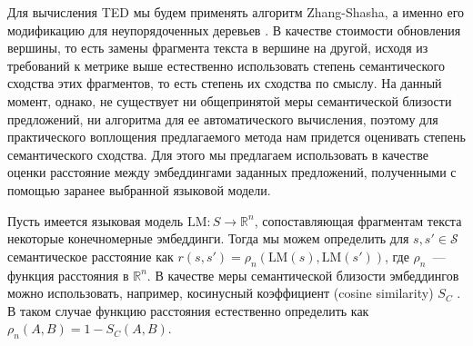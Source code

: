 \documentclass[12pt]{article}
\newcommand{\R}{\mathbb{R}}
\begin{document}
Для вычисления TED мы будем применять алгоритм Zhang-Shasha, а именно его модификацию для неупорядоченных деревьев \cite{zhang1992editing}. В качестве стоимости обновления вершины, то есть замены фрагмента текста в вершине на другой, исходя из требований к метрике выше естественно использовать степень семантического сходства этих фрагментов, то есть степень их сходства по смыслу. На данный момент, однако, не существует ни общепринятой меры семантической близости предложений, ни алгоритма для ее автоматического вычисления, поэтому для практического воплощения предлагаемого метода нам придется оценивать степень семантического сходства. Для этого мы предлагаем использовать в качестве оценки расстояние между эмбеддингами заданных предложений, полученными с помощью заранее выбранной языковой модели. 

Пусть имеется языковая модель $\text{LM}: S \rightarrow \R^n$, сопоставляющая фрагментам текста некоторые конечномерные эмбеддинги. Тогда мы можем определить для $s, s'\in\mathcal{S}$ семантическое расстояние как $r(s, s') = \rho_n(\text{LM}(s), \text{LM}(s'))$, где $\rho_n$~--- функция расстояния в $\R^n$. В качестве меры семантической близости эмбеддингов можно использовать, например, косинусный коэффициент (cosine similarity) $S_C$ \cite{vrbanec2023comparison}. В таком случае функцию расстояния естественно определить как $\rho_n(A, B) = 1 - S_C(A, B)$.
\end{document}
